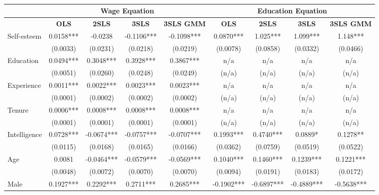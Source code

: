 \documentclass[12pt]{report}
\newcommand{\prbf}[1]{\textbf{#1}}
\begin{document}
\begin{comment}R-sq & 0.1572 & 0.0593 & 0.0330 & 0.0349 & 0.6456 & 0.3819 & 0.1780 & 0.4626\\
\end{comment}

\newpage

\begin{sidewaystable}
\small
\caption{\label{tab:wage87c}}
\vspace{2pt}
\centering\begin{tabular}{lc|c|c|c|c|c|c|c}
\hline
\hline
& \multicolumn{4}{|c|}{Wage Equation} & \multicolumn{4}{|c}{Education Equation}\\
\hline
& \prbf{OLS} & \prbf{2SLS} & \prbf{3SLS} & \prbf{3SLS GMM} & \prbf{OLS} & \prbf{2SLS} & \prbf{3SLS} & \prbf{3SLS GMM}\\
\hline
Self-esteem & 0.0158*** & -0.0238 & -0.1106*** & -0.1098*** & 0.0870*** & 1.025*** & 1.099*** & 1.148***\\
& (0.0033) & (0.0231) & (0.0218) & (0.0219) & (0.0078) & (0.0858) & (0.0332) & (0.0466)\\
Education & 0.0494*** & 0.3048*** & 0.3928*** & 0.3867*** & n/a & n/a & n/a & n/a\\
& (0.0051) & (0.0260) & (0.0248) & (0.0249) & (n/a) & (n/a) & (n/a) & (n/a)\\
Experience & 0.0011*** & 0.0022*** & 0.0023*** & 0.0023*** & n/a & n/a & n/a & n/a\\
& (0.0001) & (0.0002) & (0.0002) & (0.0002) & (n/a) & (n/a) & (n/a) & (n/a)\\
Tenure & 0.0006*** & 0.0008*** & 0.0008*** & 0.0008*** & n/a & n/a & n/a & n/a\\
& (0.0001) & (0.0001) & (0.0001) & (0.0001) & (n/a) & (n/a) & (n/a) & (n/a)\\
Intelligence & 0.0728*** & -0.0674*** & -0.0757*** & -0.0707*** & 0.1993*** & 0.4740*** & 0.0889* & 0.1278**\\
& (0.0115) & (0.0168) & (0.0165) & (0.0166) & (0.0362) & (0.0759) & (0.0519) & (0.0522)\\
Age & 0.0081 & -0.0464*** & -0.0579*** & -0.0569*** & 0.1040*** & 0.1460*** & 0.1239*** & 0.1221***\\
& (0.0048) & (0.0072) & (0.0070) & (0.0070) & (0.0094) & (0.0191) & (0.0183) & (0.0172)\\
Male & 0.1927*** & 0.2292*** & 0.2711*** & 0.2685*** & -0.1902*** & -0.6897*** & -0.4889*** & -0.5638***\\

\end{tabular}
\end{sidewaystable}
\end{document}
